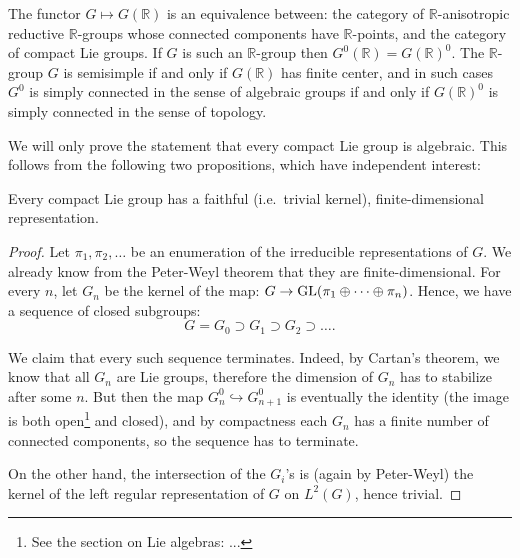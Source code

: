 \begin{theorem}
 The functor $G\mapsto G(\mathbb R)$ is an equivalence between: the category of $\mathbb R$-anisotropic reductive $\mathbb R$-groups whose connected components have $\mathbb R$-points, and the category of compact Lie groups. If $G$ is such an $\mathbb R$-group then $G^0(\mathbb R)=G(\mathbb R)^0$. The $\mathbb R$-group $G$ is semisimple if and only if $G(\mathbb R)$ has finite center, and in such cases $G^0$ is simply connected in the sense of algebraic groups if and only if $G(\mathbb R)^0$ is simply connected in the sense of topology.
\end{theorem}

We will only prove the statement that every compact Lie group is algebraic. This follows from the following two propositions, which have independent interest:

\begin{proposition}
 Every compact Lie group has a faithful (i.e.\ trivial kernel), finite-dimensional representation.
\end{proposition}

\begin{proof}
 Let $\pi_1,\pi_2,\dots$ be an enumeration of the irreducible representations of $G$. We already know from the Peter-Weyl theorem that they are finite-dimensional. For every $n$, let $G_n$ be the kernel of the map: $G\to {\rm GL}(\pi_1\oplus\dots\oplus \pi_n)$. Hence, we have a sequence of closed subgroups:
$$ G=G_0\supset G_1\supset G_2\supset \dots.$$

We claim that every such sequence terminates. Indeed, by Cartan's theorem, we know that all $G_n$ are Lie groups, therefore the dimension of $G_n$ has to stabilize after some $n$. But then the map $G_n^0\hookrightarrow G_{n+1}^0$ is eventually the identity (the image is both open\footnote{See the section on Lie algebras: ...} and closed), and by compactness each $G_n$ has a finite number of connected components, so the sequence has to terminate.

On the other hand, the intersection of the $G_i$'s is (again by Peter-Weyl) the kernel of the left regular representation of $G$ on $L^2(G)$, hence trivial.
\end{proof}

